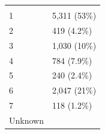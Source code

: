 \documentclass[]{article}
\begin{document}
\begin{longtable}[]{@{}ll@{}}
\begin{minipage}[t]{0.23\columnwidth}
\strut
\end{minipage}\tabularnewline
\begin{minipage}[t]{0.71\columnwidth}\raggedright
1\strut
\end{minipage} & \begin{minipage}[t]{0.23\columnwidth}\raggedright
5,311 (53\%)\strut
\end{minipage}\tabularnewline
\begin{minipage}[t]{0.71\columnwidth}\raggedright
2\strut
\end{minipage} & \begin{minipage}[t]{0.23\columnwidth}\raggedright
419 (4.2\%)\strut
\end{minipage}\tabularnewline
\begin{minipage}[t]{0.71\columnwidth}\raggedright
3\strut
\end{minipage} & \begin{minipage}[t]{0.23\columnwidth}\raggedright
1,030 (10\%)\strut
\end{minipage}\tabularnewline
\begin{minipage}[t]{0.71\columnwidth}\raggedright
4\strut
\end{minipage} & \begin{minipage}[t]{0.23\columnwidth}\raggedright
784 (7.9\%)\strut
\end{minipage}\tabularnewline
\begin{minipage}[t]{0.71\columnwidth}\raggedright
5\strut
\end{minipage} & \begin{minipage}[t]{0.23\columnwidth}\raggedright
240 (2.4\%)\strut
\end{minipage}\tabularnewline
\begin{minipage}[t]{0.71\columnwidth}\raggedright
6\strut
\end{minipage} & \begin{minipage}[t]{0.23\columnwidth}\raggedright
2,047 (21\%)\strut
\end{minipage}\tabularnewline
\begin{minipage}[t]{0.71\columnwidth}\raggedright
7\strut
\end{minipage} & \begin{minipage}[t]{0.23\columnwidth}\raggedright
118 (1.2\%)\strut
\end{minipage}\tabularnewline
\begin{minipage}[t]{0.71\columnwidth}\raggedright
Unknown\strut
\end{minipage} & \begin{minipage}[t]{0.23\columnwidth}\raggedright

\end{minipage}
\end{longtable}
\end{document}
